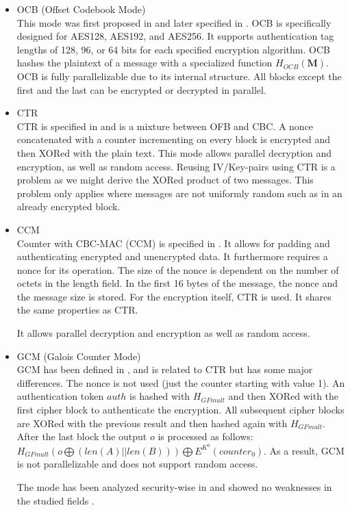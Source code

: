 \begin{itemize}
	\item OCB (Offset Codebook Mode)\\
	This mode was first proposed in \cite{rogaway2003ocb} and later specified in \cite{krovetz-ocb-04}. OCB is specifically designed for AES128, AES192, and AES256. It supports authentication tag lengths of 128, 96, or 64 bits for each specified encryption algorithm. OCB hashes the plaintext of a message with a specialized function $H_{OCB}(\mathbf{M})$. OCB is fully parallelizable due to its internal structure. All blocks except the first and the last can be encrypted or decrypted in parallel.
	\item CTR\\
	CTR is specified in \cite{lipmaa2000ctr} and is a mixture between OFB and CBC. A nonce concatenated with a counter incrementing on every block is encrypted and then XORed with the plain text. This mode allows parallel decryption and encryption, as well as random access. Reusing IV/Key-pairs using CTR is a problem as we might derive the XORed product of two messages. This problem only applies where messages are not uniformly random such as in an already encrypted block.
	\item CCM\\
	Counter with CBC-MAC (CCM) is specified in \cite{rfc3610}. It allows for padding and authenticating encrypted and unencrypted data. It furthermore requires a nonce for its operation. The size of the nonce is dependent on the number of octets in the length field. In the first 16 bytes of the message, the nonce and the message size is stored. For the encryption itself, CTR is used. It shares the same properties as CTR. 
	
	It allows parallel decryption and encryption as well as random access.
	\item GCM (Galois Counter Mode)\\
	GCM has been defined in \cite{mcgrew2004galois}, and is related to CTR but has some major differences. The nonce is not used (just the counter starting with value 1). An authentication token $auth$ is hashed with $H_{GFmult}$ and then XORed with the first cipher block to authenticate the encryption. All subsequent cipher blocks are XORed with the previous result and then hashed again with $H_{GFmult}$. After the last block the output $o$ is processed  as follows: $H_{GFmult}(o\bigoplus (len(A)||len(B))) \bigoplus E^{K^0}(counter_0)$. As a result, GCM is not parallelizable and does not support random access.
	
	The mode has been analyzed security-wise in \citeyear{mcgrew2004security} and showed no weaknesses in the studied fields \cite{mcgrew2004security}. 
	

\end{itemize}
